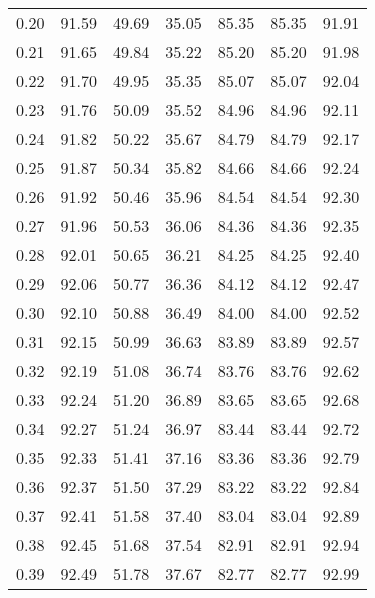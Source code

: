 \begin{tabular}{|c|c|c|c|c|c|c|}
      0.20 &     91.59 &     49.69 &      35.05 &   85.35 &      85.35 &         91.91 \\
      0.21 &     91.65 &     49.84 &      35.22 &   85.20 &      85.20 &         91.98 \\
      0.22 &     91.70 &     49.95 &      35.35 &   85.07 &      85.07 &         92.04 \\
      0.23 &     91.76 &     50.09 &      35.52 &   84.96 &      84.96 &         92.11 \\
      0.24 &     91.82 &     50.22 &      35.67 &   84.79 &      84.79 &         92.17 \\
      0.25 &     91.87 &     50.34 &      35.82 &   84.66 &      84.66 &         92.24 \\
      0.26 &     91.92 &     50.46 &      35.96 &   84.54 &      84.54 &         92.30 \\
      0.27 &     91.96 &     50.53 &      36.06 &   84.36 &      84.36 &         92.35 \\
      0.28 &     92.01 &     50.65 &      36.21 &   84.25 &      84.25 &         92.40 \\
      0.29 &     92.06 &     50.77 &      36.36 &   84.12 &      84.12 &         92.47 \\
      0.30 &     92.10 &     50.88 &      36.49 &   84.00 &      84.00 &         92.52 \\
      0.31 &     92.15 &     50.99 &      36.63 &   83.89 &      83.89 &         92.57 \\
      0.32 &     92.19 &     51.08 &      36.74 &   83.76 &      83.76 &         92.62 \\
      0.33 &     92.24 &     51.20 &      36.89 &   83.65 &      83.65 &         92.68 \\
      0.34 &     92.27 &     51.24 &      36.97 &   83.44 &      83.44 &         92.72 \\
      0.35 &     92.33 &     51.41 &      37.16 &   83.36 &      83.36 &         92.79 \\
      0.36 &     92.37 &     51.50 &      37.29 &   83.22 &      83.22 &         92.84 \\
      0.37 &     92.41 &     51.58 &      37.40 &   83.04 &      83.04 &         92.89 \\
      0.38 &     92.45 &     51.68 &      37.54 &   82.91 &      82.91 &         92.94 \\
      0.39 &     92.49 &     51.78 &      37.67 &   82.77 &      82.77 &         92.99 \\

\end{tabular}
